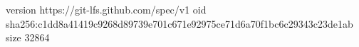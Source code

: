 version https://git-lfs.github.com/spec/v1
oid sha256:c1dd8a41419c9268d89739e701c671e92975ce71d6a70f1bc6c29343c23de1ab
size 32864
